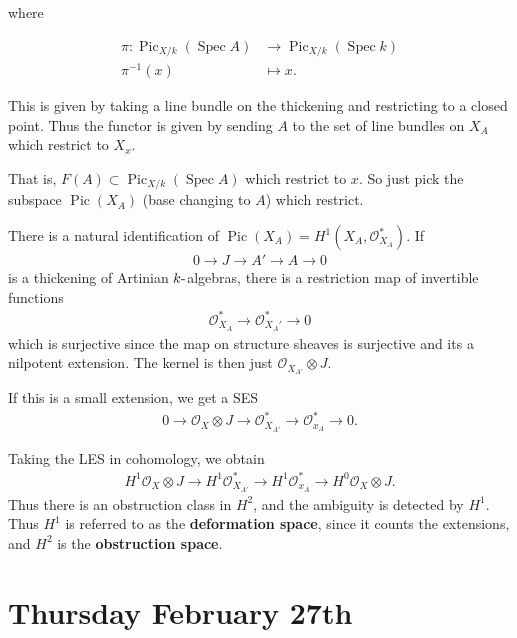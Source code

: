 where

\begin{align*}   \pi: {\operatorname{Pic}}_{X/k}(\operatorname{Spec}A) &\to {\operatorname{Pic}}_{X/k} (\operatorname{Spec}k) \\   \pi^{-1}(x) &\mapsto x   .\end{align*}

This is given by taking a line bundle on the thickening and restricting
to a closed point. Thus the functor is given by sending \(A\) to the set
of line bundles on \(X_A\) which restrict to \(X_x\).

That is,
\(F(A) \subset {\operatorname{Pic}}_{X/k}(\operatorname{Spec}A)\) which
restrict to \(x\). So just pick the subspace
\({\operatorname{Pic}}(X_A)\) (base changing to \(A\)) which restrict.

There is a natural identification of
\({\operatorname{Pic}}(X_A) = H^1(X_A, {\mathcal{O}}_{X_A}^*)\). If
\begin{align*}
  0\to J \to A' \to A \to 0
  \end{align*}
is a thickening of Artinian \(k{\hbox{-}}\)algebras, there is a
restriction map of invertible functions
\begin{align*}
  {\mathcal{O}}_{X_A}^* \to {\mathcal{O}}_{X_A'}^* \to 0
  \end{align*}
which is surjective since the map on structure sheaves is surjective and
its a nilpotent extension. The kernel is then just
\({\mathcal{O}}_{X_{A'}} \otimes J\).

If this is a small extension, we get a SES
\begin{align*}
  0 \to {\mathcal{O}}_X \otimes J \to {\mathcal{O}}_{X_{A'}}^* \to {\mathcal{O}}_{x_A}^* \to 0
  .\end{align*}

Taking the LES in cohomology, we obtain
\begin{align*}
  H^1 {\mathcal{O}}_X \otimes J \to H^1 {\mathcal{O}}_{X_{A'}}^* \to H^1{\mathcal{O}}_{x_A}^* \to H^0 {\mathcal{O}}_X \otimes J
  .\end{align*}
Thus there is an obstruction class in \(H^2\), and the ambiguity is
detected by \(H^1\). Thus \(H^1\) is referred to as the
\textbf{deformation space}, since it counts the extensions, and \(H^2\)
is the \textbf{obstruction space}.

\hypertarget{thursday-february-27th}{%
\section{Thursday February 27th}\label{thursday-february-27th}}

